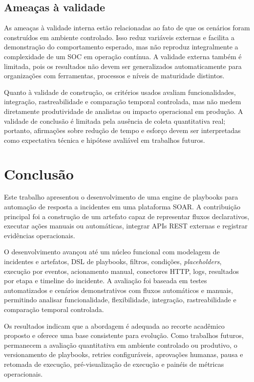 \documentclass[article,a4paper,12pt,english,brazil,sumario=tradicional]{abntex2}
\begin{document}
\subsection{Ameaças à validade}

As ameaças à validade interna estão relacionadas ao fato de que os cenários foram construídos em ambiente controlado. Isso reduz variáveis externas e facilita a demonstração do comportamento esperado, mas não reproduz integralmente a complexidade de um SOC em operação contínua. A validade externa também é limitada, pois os resultados não devem ser generalizados automaticamente para organizações com ferramentas, processos e níveis de maturidade distintos.

Quanto à validade de construção, os critérios usados avaliam funcionalidades, integração, rastreabilidade e comparação temporal controlada, mas não medem diretamente produtividade de analistas ou impacto operacional em produção. A validade de conclusão é limitada pela ausência de coleta quantitativa real; portanto, afirmações sobre redução de tempo e esforço devem ser interpretadas como expectativa técnica e hipótese avaliável em trabalhos futuros.

\section{Conclusão}

Este trabalho apresentou o desenvolvimento de uma engine de playbooks para automação de resposta a incidentes em uma plataforma SOAR. A contribuição principal foi a construção de um artefato capaz de representar fluxos declarativos, executar ações manuais ou automáticas, integrar APIs REST externas e registrar evidências operacionais.

O desenvolvimento avançou até um núcleo funcional com modelagem de incidentes e artefatos, DSL de playbooks, filtros, condições, \textit{placeholders}, execução por eventos, acionamento manual, conectores HTTP, logs, resultados por etapa e timeline do incidente. A avaliação foi baseada em testes automatizados e cenários demonstrativos com fluxos automáticos e manuais, permitindo analisar funcionalidade, flexibilidade, integração, rastreabilidade e comparação temporal controlada.

Os resultados indicam que a abordagem é adequada ao recorte acadêmico proposto e oferece uma base consistente para evolução. Como trabalhos futuros, permanecem a avaliação quantitativa em ambiente controlado ou produtivo, o versionamento de playbooks, retries configuráveis, aprovações humanas, pausa e retomada de execução, pré-visualização de execução e painéis de métricas operacionais.
\end{document}
